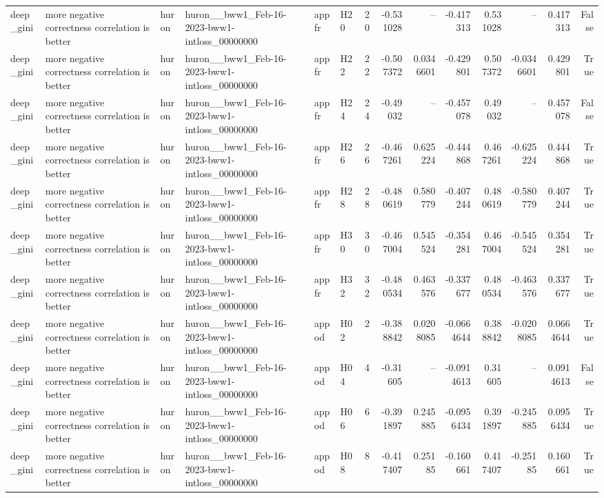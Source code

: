 \begin{longtable}{llllllrrrrrrrr}
deep\_gini & more negative correctness correlation is better & huron & huron\_\_bww1\_Feb-16-2023-bww1-intloss\_00000000 & appfr & H20 & 20 & -0.531028 & -- & -0.417313 & 0.531028 & -- & 0.417313 & False \\
deep\_gini & more negative correctness correlation is better & huron & huron\_\_bww1\_Feb-16-2023-bww1-intloss\_00000000 & appfr & H22 & 22 & -0.507372 & 0.0346601 & -0.429801 & 0.507372 & -0.0346601 & 0.429801 & True \\
deep\_gini & more negative correctness correlation is better & huron & huron\_\_bww1\_Feb-16-2023-bww1-intloss\_00000000 & appfr & H24 & 24 & -0.49032 & -- & -0.457078 & 0.49032 & -- & 0.457078 & False \\
deep\_gini & more negative correctness correlation is better & huron & huron\_\_bww1\_Feb-16-2023-bww1-intloss\_00000000 & appfr & H26 & 26 & -0.467261 & 0.625224 & -0.444868 & 0.467261 & -0.625224 & 0.444868 & True \\
deep\_gini & more negative correctness correlation is better & huron & huron\_\_bww1\_Feb-16-2023-bww1-intloss\_00000000 & appfr & H28 & 28 & -0.480619 & 0.580779 & -0.407244 & 0.480619 & -0.580779 & 0.407244 & True \\
deep\_gini & more negative correctness correlation is better & huron & huron\_\_bww1\_Feb-16-2023-bww1-intloss\_00000000 & appfr & H30 & 30 & -0.467004 & 0.545524 & -0.354281 & 0.467004 & -0.545524 & 0.354281 & True \\
deep\_gini & more negative correctness correlation is better & huron & huron\_\_bww1\_Feb-16-2023-bww1-intloss\_00000000 & appfr & H32 & 32 & -0.480534 & 0.463576 & -0.337677 & 0.480534 & -0.463576 & 0.337677 & True \\
deep\_gini & more negative correctness correlation is better & huron & huron\_\_bww1\_Feb-16-2023-bww1-intloss\_00000000 & appod & H02 & 2 & -0.388842 & 0.0208085 & -0.0664644 & 0.388842 & -0.0208085 & 0.0664644 & True \\
deep\_gini & more negative correctness correlation is better & huron & huron\_\_bww1\_Feb-16-2023-bww1-intloss\_00000000 & appod & H04 & 4 & -0.31605 & -- & -0.0914613 & 0.31605 & -- & 0.0914613 & False \\
deep\_gini & more negative correctness correlation is better & huron & huron\_\_bww1\_Feb-16-2023-bww1-intloss\_00000000 & appod & H06 & 6 & -0.391897 & 0.245885 & -0.0956434 & 0.391897 & -0.245885 & 0.0956434 & True \\
deep\_gini & more negative correctness correlation is better & huron & huron\_\_bww1\_Feb-16-2023-bww1-intloss\_00000000 & appod & H08 & 8 & -0.417407 & 0.25185 & -0.160661 & 0.417407 & -0.25185 & 0.160661 & True \\

\end{longtable}
